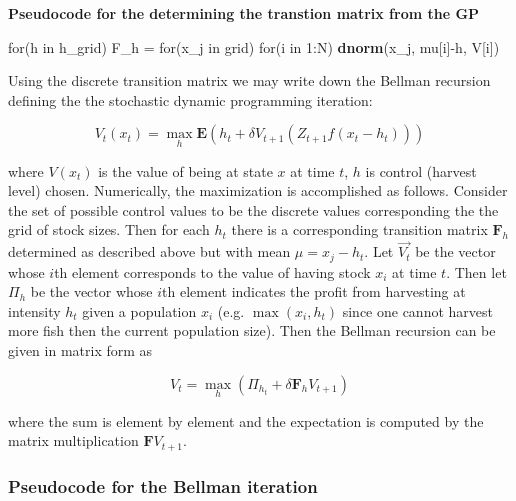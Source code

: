 \documentclass[author-year, review]{elsarticle} %
\newenvironment{Shaded}{}{}
\newcommand{\KeywordTok}[1]{\textcolor[rgb]{0.00,0.44,0.13}{\textbf{{#1}}}}
\newcommand{\DecValTok}[1]{\textcolor[rgb]{0.25,0.63,0.44}{{#1}}}
\newcommand{\StringTok}[1]{\textcolor[rgb]{0.25,0.44,0.63}{{#1}}}
\newcommand{\NormalTok}[1]{{#1}}
\begin{document}
\textbf{Pseudocode for the determining the transtion matrix from the GP}

\begin{Shaded}
\begin{Highlighting}[]
\NormalTok{for(h in h_grid)}
  \NormalTok{F_h =}\StringTok{ }\NormalTok{for(x_j in grid)}
          \NormalTok{for(i in }\DecValTok{1}\NormalTok{:N) }
            \KeywordTok{dnorm}\NormalTok{(x_j, mu[i]-h, V[i])}
\end{Highlighting}
\end{Shaded}

Using the discrete transition matrix we may write down the Bellman
recursion defining the the stochastic dynamic programming iteration:

\begin{equation}
V_t(x_t) = \max_h \mathbf{E} \left( h_t + \delta V_{t+1}( Z_{t+1} f(x_t - h_t)) \right)
\end{equation}

where $V(x_t)$ is the value of being at state $x$ at time $t$, $h$ is
control (harvest level) chosen. Numerically, the maximization is
accomplished as follows. Consider the set of possible control values to
be the discrete values corresponding the the grid of stock sizes. Then
for each $h_t$ there is a corresponding transition matrix $\mathbf{F}_h$
determined as described above but with mean $\mu = x_j - h_t$. Let
$\vec{V_t}$ be the vector whose $i$th element corresponds to the value
of having stock $x_i$ at time $t$. Then let $\Pi_h$ be the vector whose
$i$th element indicates the profit from harvesting at intensity $h_t$
given a population $x_i$ (e.g. $\max(x_i, h_t)$ since one cannot harvest
more fish then the current population size). Then the Bellman recursion
can be given in matrix form as

\[V_{t} = \max_h \left( \Pi_{h_{t}} + \delta \mathbf{F}_h V_{t+1} \right)\]

where the sum is element by element and the expectation is computed by
the matrix multiplication $\mathbf{F} V_{t+1}$.

\subsubsection{Pseudocode for the Bellman iteration}
\end{document}
